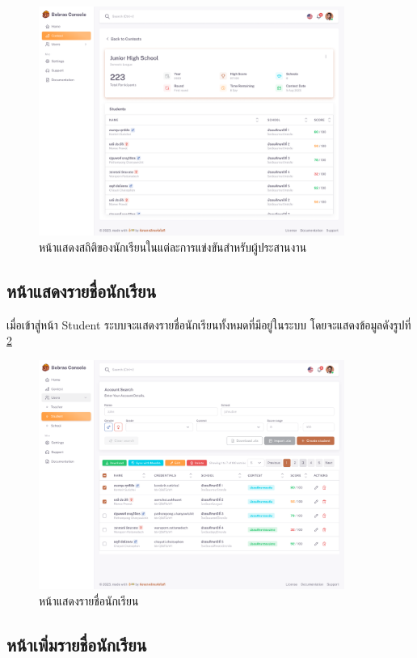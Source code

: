 \begin{figure}[H]
    \centering
    \includegraphics[width=100mm,scale=1.0]{images/teacher-contest-stats.png}
    \caption{หน้าแสดงสถิติของนักเรียนในแต่ละการแข่งขันสำหรับผู้ประสานงาน}
    \label{fig:teacher-contest-stats}
\end{figure}

\subsection{หน้าแสดงรายชื่อนักเรียน}

เมื่อเข้าสู่หน้า Student ระบบจะแสดงรายชื่อนักเรียนทั้งหมดที่มีอยู่ในระบบ โดยจะแสดงข้อมูลดังรูปที่ \ref{fig:dashboard-student}

\begin{figure}[H]
    \centering
    \includegraphics[width=100mm,scale=1.0]{images/student-dashboard.png}
    \caption{หน้าแสดงรายชื่อนักเรียน}
    \label{fig:dashboard-student}
\end{figure}

\subsection{หน้าเพิ่มรายชื่อนักเรียน}

